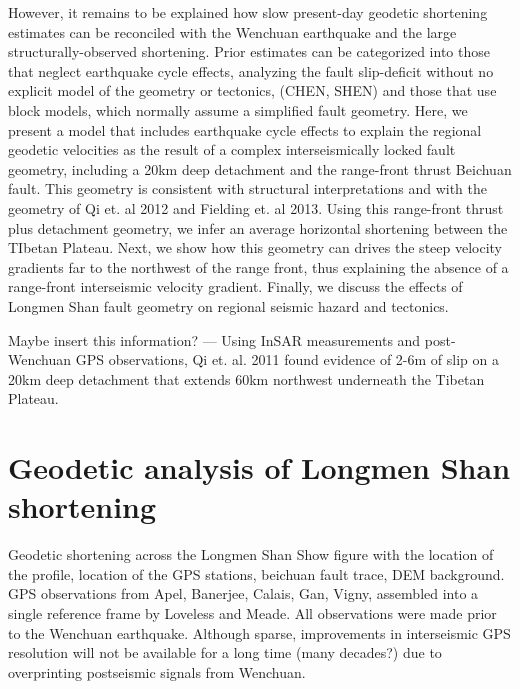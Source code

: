 \documentclass{article}
\begin{document}
However, it remains to be explained how slow present-day geodetic shortening estimates can be reconciled with the Wenchuan earthquake and the large structurally-observed shortening.
Prior estimates can be categorized into those that neglect earthquake cycle effects, analyzing the fault slip-deficit without no explicit model of the geometry or tectonics, (CHEN, SHEN) and those that use block models, which normally assume a simplified fault geometry. 
Here, we present a model that includes earthquake cycle effects to explain the regional geodetic velocities as the result of a complex interseismically locked fault geometry, including a 20km deep detachment and the range-front thrust Beichuan fault.
This geometry is consistent with structural interpretations and with the geometry of Qi et. al 2012 and Fielding et. al 2013. 
Using this range-front thrust plus detachment geometry, we infer an average horizontal shortening between the TIbetan Plateau.
Next, we show how this geometry can drives the steep velocity gradients far to the northwest of the range front, thus explaining the absence of a range-front interseismic velocity gradient.
Finally, we discuss the effects of Longmen Shan fault geometry on regional seismic hazard and tectonics.

Maybe insert this information? --- Using InSAR measurements and post-Wenchuan GPS observations, Qi et. al. 2011 found evidence of 2-6m of slip on a 20km deep detachment that extends 60km northwest underneath the Tibetan Plateau. 

\section{Geodetic analysis of Longmen Shan shortening}
Geodetic shortening across the Longmen Shan
Show figure with the location of the profile, location of the GPS stations, beichuan fault trace, DEM background.
GPS observations from Apel, Banerjee, Calais, Gan, Vigny, assembled into a single reference frame by Loveless and Meade.
All observations were made prior to the Wenchuan earthquake.
Although sparse, improvements in interseismic GPS resolution will not be available for a long time (many decades?) due to overprinting postseismic signals from Wenchuan.
\end{document}
